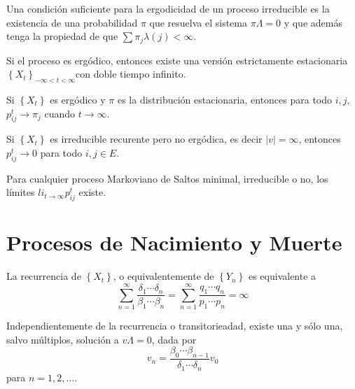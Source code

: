 \begin{Cor}\label{Cor.4.4}
Una condici\'on suficiente para la ergodicidad de un proceso irreducible es la existencia de una probabilidad $\pi$ que resuelva el sistema $\pi\Lambda=0$ y que adem\'as tenga la propiedad de que $\sum\pi_{j}\lambda\left(j\right)<\infty$.
\end{Cor}

\begin{Prop}
Si el proceso es erg\'odico, entonces existe una versi\'on estrictamente estacionaria
$\left\{X_{t}\right\}_{-\infty<t<\infty}$con doble tiempo
infinito.
\end{Prop}

\begin{Teo}
Si $\left\{X_{t}\right\}$ es erg\'odico y $\pi$ es la distribuci\'on estacionaria, entonces para todo $i,j$, $p_{ij}^{t}\rightarrow\pi_{j}$ cuando $t\rightarrow\infty$.
\end{Teo}

\begin{Cor}
Si $\left\{X_{t}\right\}$ es irreducible recurente pero no erg\'odica, es decir $|v|=\infty$, entonces $p_{ij}^{t}\rightarrow0$ para todo $i,j\in E$.
\end{Cor}

\begin{Cor}
Para cualquier proceso Markoviano de Saltos minimal, irreducible o
no, los l\'imites $li_{t\rightarrow\infty}p_{ij}^{t}$ existe.
\end{Cor}


%
\section{Procesos de Nacimiento y Muerte}
%

\begin{Prop}\label{Prop.2.1}
La recurrencia de $\left\{X_{t}\right\}$, o equivalentemente de
$\left\{Y_{n}\right\}$ es equivalente a
\begin{equation}\label{Eq.2.1}
\sum_{n=1}^{\infty}\frac{\delta_{1}\cdots\delta_{n}}{\beta_{1}\cdots\beta_{n}}=\sum_{n=1}^{\infty}\frac{q_{1}\cdots
q_{n}}{p_{1}\cdots p_{n}}=\infty
\end{equation}
\end{Prop}

\begin{Lema}\label{Lema.2.2}
Independientemente de la recurrencia o transitorieadad, existe una
y s\'olo una, salvo m\'ultiplos, soluci\'on a $v\Lambda=0$, dada por
\begin{equation}\label{Eq.2.2}
v_{n}=\frac{\beta_{0}\cdots\beta_{n-1}}{\delta_{1}\cdots\delta_{n}}v_{0}
\end{equation}
para $n=1,2,\ldots$.
\end{Lema}

